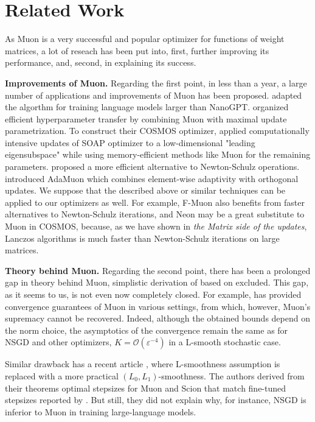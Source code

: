 \documentclass{article} %
\renewcommand{\epsilon}{\varepsilon}
\newcommand{\cO}{\mathcal{O}}
\begin{document}
\section{Related Work}
As Muon \citep{jordan2024muon} is a very successful and popular optimizer for functions of weight matrices, a lot of reseach has been put into, first, further improving its performance, and, second, in explaining its success.

{\bf Improvements of Muon.} Regarding the first point, in less than a year, a large number of applications and improvements of Muon has been proposed. \citet{liu2025muon} adapted the algorthm for training language models larger than NanoGPT. \citet{shah2025practical} organized efficient hyperparameter transfer by combining Muon with maximal update parametrization. To construct their COSMOS optimizer, \citet{chen2025cosmoshybridadaptive} applied computationally intensive updates of SOAP optimizer to a low-dimensional "leading eigensubspace" while using memory-efficient methods like Muon for the remaining parameters. \citet{amsel2025polar} proposed a more efficient alternative to Newton-Schulz operations. \citet{si2025adamuon} introduced AdaMuon which combines element-wise adaptivity with orthogonal updates. We suppose that the described above or similar techniques can be applied to our optimizers as well. For example, F-Muon also benefits from faster alternatives to Newton-Schulz iterations, and Neon may be a great substitute to Muon in COSMOS, because, as we have shown in {\it the Matrix side of the updates}, Lanczos algorithms is much faster than Newton-Schulz iterations on large matrices.

{\bf Theory behind Muon.} Regarding the second point, there has been a prolonged gap in theory behind Muon, simplistic derivation of \citet{bernstein2025deriving} based on \citet{bernstein2024oldoptimizernewnorm} excluded. This gap, as it seems to us, is not even now completely closed. For example, \citet{kovalev2025understanding} has provided convergence guarantees of Muon in various settings, from which, however, Muon's supremacy cannot be recovered. Indeed, although the obtained bounds depend on the norm choice, the asymptotics of the convergence remain the same as for NSGD and other optimizers, $K = \cO(\epsilon^{-4})$ in a L-smooth stochastic case.

Similar drawback has a recent article \citet{riabinin2025gluon}, where L-smoothness assumption is replaced with a more practical $(L_0, L_1)$-smoothness. The authors derived from their theorems optimal stepsizes for Muon and Scion that match fine-tuned stepsizes reported by \citet{pethick2025training}. But still, they did not explain why, for instance, NSGD is inferior to Muon in training large-language models.
\end{document}
